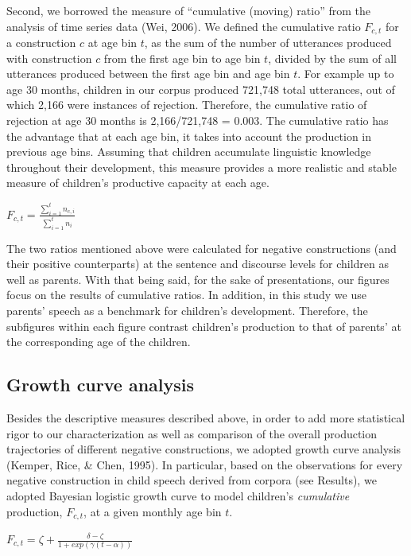 \documentclass[
  english,
  man,floatsintext]{apa6}
\begin{document}
Second, we borrowed the measure of ``cumulative (moving) ratio'' from the analysis of time series data (Wei, 2006). We defined the cumulative ratio \(F_{c,t}\) for a construction \(c\) at age bin \(t\), as the sum of the number of utterances produced with construction \(c\) from the first age bin to age bin \(t\), divided by the sum of all utterances produced between the first age bin and age bin \(t\). For example up to age 30 months, children in our corpus produced 721,748 total utterances, out of which 2,166 were instances of rejection. Therefore, the cumulative ratio of rejection at age 30 months is 2,166/721,748 = 0.003. The cumulative ratio has the advantage that at each age bin, it takes into account the production in previous age bins. Assuming that children accumulate linguistic knowledge throughout their development, this measure provides a more realistic and stable measure of children's productive capacity at each age.

\(F_{c, t} = \frac{\sum_{i=1}^{t} n_{c,i}}{\sum_{i=1}^{t} n_{i}}\)

The two ratios mentioned above were calculated for negative constructions (and their positive counterparts) at the sentence and discourse levels for children as well as parents. With that being said, for the sake of presentations, our figures focus on the results of cumulative ratios. In addition, in this study we use parents' speech as a benchmark for children's development. Therefore, the subfigures within each figure contrast children's production to that of parents' at the corresponding age of the children.

\hypertarget{growth-curve-analysis}{%
\subsection{Growth curve analysis}\label{growth-curve-analysis}}

Besides the descriptive measures described above, in order to add more statistical rigor to our characterization as well as comparison of the overall production trajectories of different negative constructions, we adopted growth curve analysis (Kemper, Rice, \& Chen, 1995). In particular, based on the observations for every negative construction in child speech derived from corpora (see Results), we adopted Bayesian logistic growth curve to model children's \emph{cumulative} production, \(F_{c,t}\), at a given monthly age bin \(t\).

\(F_{c, t} = \zeta + \frac{\delta - \zeta}{1 + exp(\gamma(t - \alpha))}\)
\end{document}
